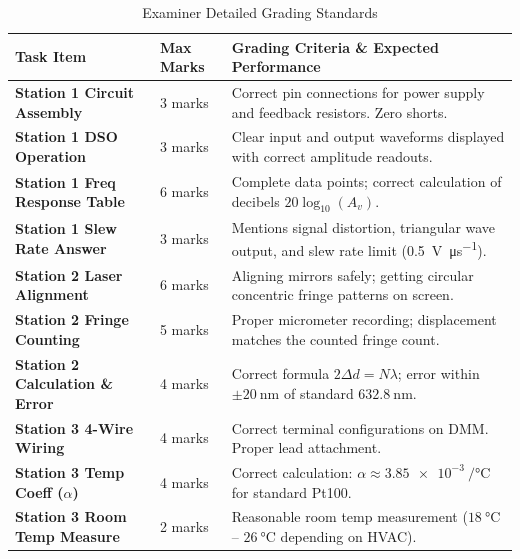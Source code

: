 \begin{table}[h!]
\centering
\sffamily
\small
\renewcommand{\arraystretch}{1.3}
\begin{tabularx}{\textwidth}{|l|C{2.0cm}|X|}
    \hline
    \textbf{Task Item} & \textbf{Max Marks} & \textbf{Grading Criteria \& Expected Performance} \\
    \hline
    \textbf{Station 1 Circuit Assembly} & 3 marks & Correct pin connections for power supply and feedback resistors. Zero shorts. \\
    \hline
    \textbf{Station 1 DSO Operation} & 3 marks & Clear input and output waveforms displayed with correct amplitude readouts. \\
    \hline
    \textbf{Station 1 Freq Response Table} & 6 marks & Complete data points; correct calculation of decibels $20\log_{10}(A_v)$. \\
    \hline
    \textbf{Station 1 Slew Rate Answer} & 3 marks & Mentions signal distortion, triangular wave output, and slew rate limit (\SI{0.5}{\volt\per\micro\second}). \\
    \hline
    \textbf{Station 2 Laser Alignment} & 6 marks & Aligning mirrors safely; getting circular concentric fringe patterns on screen. \\
    \hline
    \textbf{Station 2 Fringe Counting} & 5 marks & Proper micrometer recording; displacement matches the counted fringe count. \\
    \hline
    \textbf{Station 2 Calculation \& Error} & 4 marks & Correct formula $2\Delta d = N\lambda$; error within $\pm\SI{20}{\nano\meter}$ of standard $\SI{632.8}{\nano\meter}$. \\
    \hline
    \textbf{Station 3 4-Wire Wiring} & 4 marks & Correct terminal configurations on DMM. Proper lead attachment. \\
    \hline
    \textbf{Station 3 Temp Coeff ($\alpha$)} & 4 marks & Correct calculation: $\alpha \approx \SI{3.85e-3}{\per\celsius}$ for standard Pt100. \\
    \hline
    \textbf{Station 3 Room Temp Measure} & 2 marks & Reasonable room temp measurement ($\SI{18}{\celsius}$ -- $\SI{26}{\celsius}$ depending on HVAC). \\
    \hline
\end{tabularx}
\caption{Examiner Detailed Grading Standards}
\label{tab:rubric}
\end{table}
